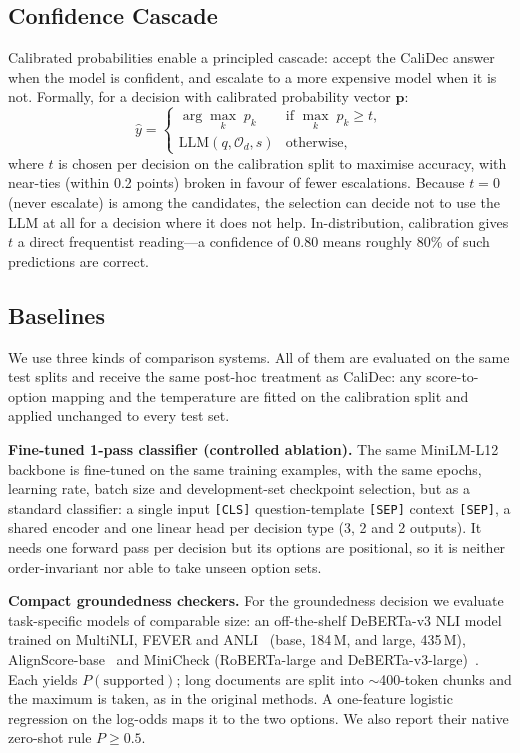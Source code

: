 \documentclass[twocolumn]{ICCKjournal}
\begin{document}
\subsection{Confidence Cascade}
\label{sec:cascade}
Calibrated probabilities enable a principled cascade: accept the CaliDec answer when the model is confident, and escalate to a more expensive model when it is not. Formally, for a decision with calibrated probability vector $\mathbf{p}$:
\begin{equation}
    \hat{y} = \begin{cases}
        \arg\max_k\; p_k & \text{if } \max_k\; p_k \ge t, \\
        \text{LLM}(q, \mathcal{O}_d, s) & \text{otherwise,}
    \end{cases}
    \label{eq:cascade}
\end{equation}
where $t$ is chosen per decision on the calibration split to maximise accuracy, with near-ties (within 0.2 points) broken in favour of fewer escalations. Because $t=0$ (never escalate) is among the candidates, the selection can decide not to use the LLM at all for a decision where it does not help. In-distribution, calibration gives $t$ a direct frequentist reading---a confidence of 0.80 means roughly 80\% of such predictions are correct.

\subsection{Baselines}
\label{sec:baselines}
We use three kinds of comparison systems. All of them are evaluated on the same test splits and receive the same post-hoc treatment as CaliDec: any score-to-option mapping and the temperature are fitted on the calibration split and applied unchanged to every test set.

\textbf{Fine-tuned 1-pass classifier (controlled ablation).} The same MiniLM-L12 backbone is fine-tuned on the same training examples, with the same epochs, learning rate, batch size and development-set checkpoint selection, but as a standard classifier: a single input \texttt{[CLS]} question-template \texttt{[SEP]} context \texttt{[SEP]}, a shared encoder and one linear head per decision type (3, 2 and 2 outputs). It needs one forward pass per decision but its options are positional, so it is neither order-invariant nor able to take unseen option sets.

\textbf{Compact groundedness checkers.} For the groundedness decision we evaluate task-specific models of comparable size: an off-the-shelf DeBERTa-v3 NLI model trained on MultiNLI, FEVER and ANLI~\cite{he2023debertav3, laurer2024less} (base, 184\,M, and large, 435\,M), AlignScore-base~\cite{zha2023alignscore} and MiniCheck (RoBERTa-large and DeBERTa-v3-large)~\cite{tang2024minicheck}. Each yields $P(\text{supported})$; long documents are split into $\sim$400-token chunks and the maximum is taken, as in the original methods. A one-feature logistic regression on the log-odds maps it to the two options. We also report their native zero-shot rule $P \ge 0.5$.
\end{document}
